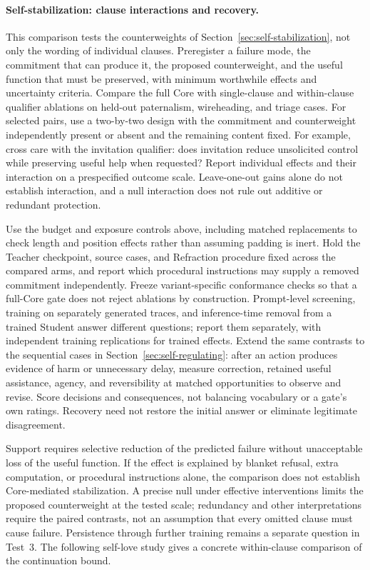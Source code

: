 \documentclass[11pt]{article}
\begin{document}
\paragraph{Self-stabilization: clause interactions and recovery.}
\label{sec:self-stabilization-test}
This comparison tests the counterweights of Section~\ref{sec:self-stabilization},
not only the wording of individual clauses. Preregister a failure mode, the
commitment that can produce it, the proposed counterweight, and the useful
function that must be preserved, with minimum worthwhile effects and
uncertainty criteria. Compare the full Core with single-clause and
within-clause qualifier ablations on held-out paternalism, wireheading, and
triage cases. For selected pairs, use a two-by-two design with the commitment
and counterweight independently present or absent and the remaining content
fixed. For example, cross care with the invitation qualifier: does invitation
reduce unsolicited control while preserving useful help when requested?
Report individual effects and their interaction on a prespecified outcome
scale. Leave-one-out gains alone do not establish interaction, and a null
interaction does not rule out additive or redundant protection.

Use the budget and exposure controls above, including matched replacements
to check length and position effects rather than assuming padding is inert.
Hold the Teacher checkpoint, source cases, and
Refraction procedure fixed across the compared arms, and report which
procedural instructions may supply a removed commitment independently.
Freeze variant-specific conformance checks so that a full-Core gate does not
reject ablations by construction.
Prompt-level screening, training on separately generated traces, and
inference-time removal from a trained Student answer different questions;
report them separately, with independent training replications for trained
effects. Extend the same contrasts to the sequential cases in
Section~\ref{sec:self-regulating}: after an action produces evidence of harm or
unnecessary delay, measure correction, retained useful assistance, agency,
and reversibility at matched opportunities to observe and revise. Score
decisions and consequences, not balancing vocabulary or a gate's own ratings.
Recovery need not restore the initial answer or eliminate legitimate
disagreement.

Support requires selective reduction of the predicted failure without
unacceptable loss of the useful function. If the effect is explained by
blanket refusal, extra computation, or procedural instructions alone, the
comparison does not establish Core-mediated stabilization. A precise null
under effective interventions limits the proposed counterweight at the tested
scale; redundancy and other interpretations require the paired contrasts, not
an assumption that every omitted clause must cause failure. Persistence
through further training remains a separate question in Test~3. The following
self-love study gives a concrete within-clause comparison of the continuation
bound.
\end{document}
